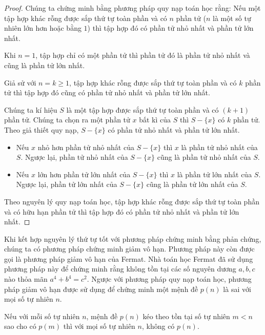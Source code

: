 \begin{proof}
    Chúng ta chứng minh bằng phương pháp quy nạp toán học rằng: Nếu một tập hợp khác rỗng được sắp thứ tự toàn phần và có $n$ phần tử ($n$ là một số tự nhiên lớn hơn hoặc bằng $1$) thì tập hợp đó có phần tử nhỏ nhất và phần tử lớn nhất.

    Khi $n = 1$, tập hợp chỉ có một phần tử thì phần tử đó là phần tử nhỏ nhất và cũng là phần tử lớn nhất.

    Giả sử với $n = k\geq 1$, tập hợp khác rỗng được sắp thứ tự toàn phần và có $k$ phần tử thì tập hợp đó cũng có phần tử nhỏ nhất và phần tử lớn nhất.

    Chúng ta kí hiệu $S$ là một tập hợp được sắp thứ tự toàn phần và có $(k+1)$ phần tử. Chúng ta chọn ra một phần tử $x$ bất kì của $S$ thì $S - \{x\}$ có $k$ phần tử. Theo giả thiết quy nạp, $S - \{x\}$ có phần tử nhỏ nhất và phần tử lớn nhất.
    \begin{itemize}
        \item Nếu $x$ nhỏ hơn phần tử nhỏ nhất của $S - \{x\}$ thì $x$ là phần tử nhỏ nhất của $S$. Ngược lại, phần tử nhỏ nhất của $S - \{x\}$ cũng là phần tử nhỏ nhất của $S$.
        \item Nếu $x$ lớn hơn phần tử lớn nhất của $S - \{x\}$ thì $x$ là phần tử lớn nhất của $S$. Ngược lại, phần tử lớn nhất của $S - \{x\}$ cũng là phần tử lớn nhất của $S$.
    \end{itemize}

    Theo nguyên lý quy nạp toán học, tập hợp khác rỗng được sắp thứ tự toàn phần và có hữu hạn phần tử thì tập hợp đó có phần tử nhỏ nhất và phần tử lớn nhất.
\end{proof}

Khi kết hợp nguyên lý thứ tự tốt với phương pháp chứng minh bằng phản chứng, chúng ta có phương pháp chứng minh giảm vô hạn. Phương pháp này còn được gọi là phương pháp giảm vô hạn của Fermat. Nhà toán học Fermat đã sử dụng phương pháp này để chứng minh rằng không tồn tại các số nguyên dương $a, b, c$ nào thỏa mãn $a^{4} + b^{4} = c^{2}$. Ngược với phương pháp quy nạp toán học, phương pháp giảm vô hạn được sử dụng để chứng minh một mệnh đề $p(n)$ là sai với mọi số tự nhiên $n$.

\begin{theorem}
    Nếu với mỗi số tự nhiên $n$, mệnh đề $p(n)$ kéo theo tồn tại số tự nhiên $m < n$ sao cho có $p(m)$ thì với mọi số tự nhiên $n$, không có $p(n)$.
\end{theorem}

